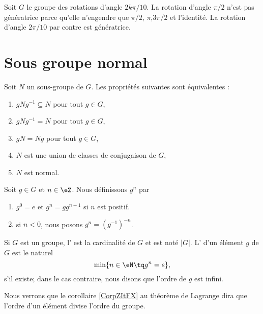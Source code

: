 \begin{example}
    Soit \( G\) le groupe des rotations d'angle \( 2k\pi/10\). La rotation d'angle \( \pi/2\) n'est pas génératrice parce qu'elle n'engendre que \( \pi/2\), \( \pi\),\( 3\pi/2\) et l'identité. La rotation d'angle \( 2\pi/10\) par contre est génératrice.
\end{example}

\section{Sous groupe normal}

\begin{proposition}
    Soit \( N\) un sous-groupe de \( G\). Les propriétés suivantes sont équivalentes :
    \begin{enumerate}
        \item
            \( gNg^{-1}\subseteq N\) pour tout \( g\in G\),
        \item
            \( gNg^{-1}= N\) pour tout \( g\in G\),
        \item
            \( gN=Ng\) pour tout \( g\in G\),
        \item
            \( N\) est une union de classes de conjugaison de \( G\),
        \item
            \( N\) est normal.
    \end{enumerate}
\end{proposition}

\begin{definition}
    Soit \( g\in G\) et \( n\in \eZ\). Nous définissons \( g^n\) par
    \begin{enumerate}
        \item
            \( g^0=e\) et \( g^n=gg^{n-1}\) si \( n\) est positif.
        \item
            si \( n<0\), nous posons \( g^n=(g^{-1})^{-n}\).
    \end{enumerate}
\end{definition}

\begin{definition}
    Si \( G\) est un groupe, l' est la cardinalité de \( G\) et est noté \( | G |\). L' d'un élément \( g\) de \( G\) est le naturel
    \begin{equation}
        \min\{ n\in\eN\tq g^n=e \},
    \end{equation}
    s'il existe; dans le cas contraire, nous disons que l'ordre de \( g\) est infini.
\end{definition}
Nous verrons que le corollaire \ref{CorpZItFX} au théorème de Lagrange dira que l'ordre d'un élément divise l'ordre du groupe.

